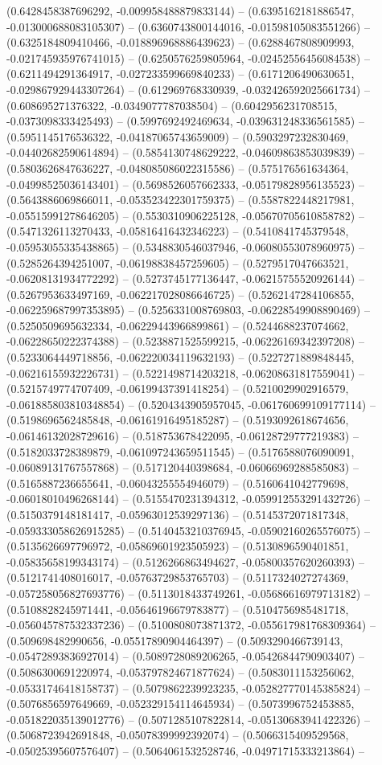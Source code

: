(0.6428458387696292, -0.009958488879833144) -- (0.6395162181886547, -0.013000688083105307) -- (0.6360743800144016, -0.01598105083551266) -- (0.6325184809410466, -0.018896968886439623) -- (0.6288467808909993, -0.021745935976741015) -- (0.6250576259805964, -0.02452556456084538) -- (0.6211494291364917, -0.027233599669840233) -- (0.6171206490630651, -0.029867929443307264) -- (0.612969768330939, -0.032426592025661734) -- (0.608695271376322, -0.0349077787038504) -- (0.6042956231708515, -0.0373098333425493) -- (0.5997692492469634, -0.039631248336561585) -- (0.5951145176536322, -0.04187065743659009) -- (0.5903297232830469, -0.04402682590614894) -- (0.5854130748629222, -0.04609863853039839) -- (0.5803626847636227, -0.048085086022315586) -- (0.575176561634364, -0.04998525036143401) -- (0.5698526057662333, -0.05179828956135523) -- (0.5643886069866011, -0.053523422301759375) -- (0.5587822448217981, -0.05515991278646205) -- (0.5530310906225128, -0.05670705610858782) -- (0.5471326113270433, -0.05816416432346223) -- (0.5410841745379548, -0.05953055335438865) -- (0.5348830546037946, -0.06080553078960975) -- (0.5285264394251007, -0.06198838457259605) -- (0.5279517047663521, -0.06208131934772292) -- (0.5273745177136447, -0.06215755520926144) -- (0.5267953633497169, -0.062217028086646725) -- (0.5262147284106855, -0.062259687997353895) -- (0.5256331008769803, -0.06228549908890469) -- (0.5250509695632334, -0.06229443966899861) -- (0.5244688237074662, -0.06228650222374388) -- (0.5238871525599215, -0.06226169342397208) -- (0.5233064449718856, -0.062220034119632193) -- (0.5227271889848445, -0.06216155932226731) -- (0.5221498714203218, -0.06208631817559041) -- (0.5215749774707409, -0.06199437391418254) -- (0.5210029902916579, -0.061885803810348854) -- (0.5204343905957045, -0.061760699109177114) -- (0.5198696562485848, -0.06161916495185287) -- (0.5193092618674656, -0.06146132028729616) -- (0.518753678422095, -0.06128729777219383) -- (0.5182033728389879, -0.061097243659511545) -- (0.5176588076090091, -0.06089131767557868) -- (0.517120440398684, -0.06066969288585083) -- (0.5165887236655641, -0.06043255554946079) -- (0.5160641042779698, -0.06018010496268144) -- (0.5155470231394312, -0.059912553291432726) -- (0.5150379148181417, -0.05963012539297136) -- (0.5145372071817348, -0.059333058626915285) -- (0.5140453210376945, -0.05902160265576075) -- (0.5135626697796972, -0.05869601923505923) -- (0.5130896590401851, -0.05835658199343174) -- (0.5126266863494627, -0.05800357620260393) -- (0.5121741408016017, -0.05763729853765703) -- (0.5117324027274369, -0.057258056827693776) -- (0.5113018433749261, -0.05686616979713182) -- (0.5108828245971441, -0.05646196679783877) -- (0.5104756985481718, -0.056045787532337236) -- (0.5100808073871372, -0.055617981768309364) -- (0.509698482990656, -0.05517890904464397) -- (0.5093290466739143, -0.05472893836927014) -- (0.5089728089206265, -0.05426844790903407) -- (0.5086300691220974, -0.053797824671877624) -- (0.5083011153256062, -0.05331746418158737) -- (0.5079862239923235, -0.052827770145385824) -- (0.5076856597649669, -0.052329154114645934) -- (0.5073996752453885, -0.051822035139012776) -- (0.5071285107822814, -0.05130683941422326) -- (0.5068723942691848, -0.05078399992392074) -- (0.5066315409529568, -0.05025395607576407) -- (0.5064061532528746, -0.04971715333213864) -- 
